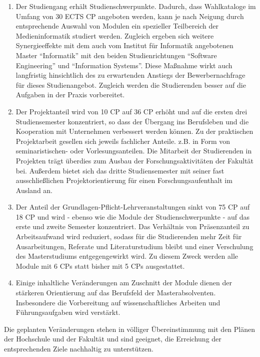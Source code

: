 \begin{enumerate}
\def\labelenumi{\arabic{enumi}.}
\tightlist
\item
  Der Studiengang erhält Studienschwerpunkte. Dadurch, dass Wahlkataloge
  im Umfang von 30 ECTS CP angeboten werden, kann je nach Neigung durch
  entsprechende Auswahl von Modulen ein spezieller Teilbereich der
  Medieninformatik studiert werden. Zugleich ergeben sich weitere
  Synergieeffekte mit dem auch vom Institut für Informatik angebotenen
  Master ``Informatik'' mit den beiden Studienrichtungen ``Software
  Engineering'' und ``Information Systems''. Diese Maßnahme wirkt auch
  langfristig hinsichtlich des zu erwartenden Anstiegs der
  Bewerbernachfrage für dieses Studienangebot. Zugleich werden die
  Studierenden besser auf die Aufgaben in der Praxis vorbereitet.
\item
  Der Projektanteil wird von 10 CP auf 36 CP erhöht und auf die ersten
  drei Studiensemester konzentriert, so dass der Übergang ins
  Berufsleben und die Kooperation mit Unternehmen verbessert werden
  können. Zu der praktischen Projektarbeit gesellen sich jeweils
  fachlicher Anteile. z.B. in Form von seminaristischen- oder
  Vorlesungsanteilen. Die Mitarbeit der Studierenden in Projekten trägt
  überdies zum Ausbau der Forschungsaktivitäten der Fakultät bei.
  Außerdem bietet sich das dritte Studiensemester mit seiner fast
  ausschließlichen Projektorientierung für einen Forschungsaufenthalt im
  Ausland an.
\item
  Der Anteil der Grundlagen-Pflicht-Lehrveranstaltungen sinkt von 75 CP
  auf 18 CP und wird - ebenso wie die Module der Studienschwerpunkte -
  auf das erste und zweite Semester konzentriert. Das Verhältnis von
  Präsenzanteil zu Arbeitsaufwand wird reduziert, sodass für die
  Studierenden mehr Zeit für Ausarbeitungen, Referate und
  Literaturstudium bleibt und einer Verschulung des Masterstudiums
  entgegengewirkt wird. Zu diesem Zweck werden alle Module mit 6 CPs
  statt bisher mit 5 CPs ausgestattet.
\item
  Einige inhaltliche Veränderungen am Zuschnitt der Module dienen der
  stärkeren Orientierung auf das Berufsfeld der Masterabsolventen.
  Insbesondere die Vorbereitung auf wissenschaftliches Arbeiten und
  Führungsaufgaben wird verstärkt.
\end{enumerate}

Die geplanten Veränderungen stehen in völliger Übereinstimmung mit den
Plänen der Hochschule und der Fakultät und sind geeignet, die Erreichung
der entsprechenden Ziele nachhaltig zu unterstützen.

